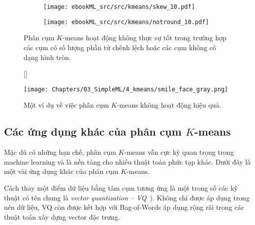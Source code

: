 \begin{figure}[t]
    \begin{subfigure}{0.49\textwidth}
   
    \texttt{[image: ebookML\_src/src/kmeans/skew\_10.pdf]}
    \caption{}
    \label{fig:4_disa}
    \end{subfigure}
    \begin{subfigure}{0.49\textwidth}
   
    \texttt{[image: ebookML\_src/src/kmeans/notround\_10.pdf]}
    \caption{}
    \label{fig:4_disb}
    \end{subfigure}
    \caption{
     Phân cụm $K$-means hoạt động không thực sự tốt trong trường hợp các
     cụm có số lượng phần tử chênh lệch hoặc các cụm không có dạng
     hình tròn. 
    }
    \label{fig:4_dis}
\end{figure}



\begin{figure}[t]
    [\FBwidth]
    {\caption{ 
        Một ví dụ về việc phân cụm $K$-means không hoạt động hiệu quả.
    }
    \label{fig:4_face}}
    { %
    \texttt{[image: Chapters/03\_SimpleML/4\_kmeans/smile\_face\_gray.png]}
    }
\end{figure}

\subsection{Các ứng dụng khác của phân cụm $K$-means}
Mặc dù có những hạn chế, phân cụm $K$-means vẫn cực kỳ quan trọng trong machine
learning và là nền tảng cho nhiều thuật toán phức tạp khác. Dưới đây là một vài ứng dụng khác của phân cụm $K$-means. 

    Cách thay một điểm dữ liệu bằng tâm cụm tương ứng là một trong số các
    kỹ thuật có tên chung là \textit{vector quantization  --
    VQ}~\cite{arya1993algorithms}). Không chỉ được áp dụng trong nén dữ liệu, VQ
    còn được kết hợp với Bag-of-Words\cite{lazebnik2006beyond} áp dụng rộng rãi
    trong các thuật toán xây dựng vector đặc trưng.


